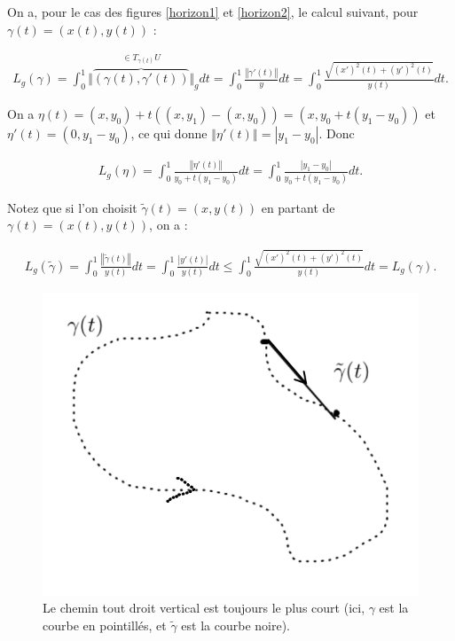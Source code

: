 \documentclass[french]{article}
\theoremstyle{definition}
\begin{document}
On a, pour le cas des figures \ref{horizon1} et \ref{horizon2}, le calcul suivant, pour \(\gamma(t) = (x(t), y(t))\) :

\begin{gather*}
  L_g(\gamma) = \int_{0}^{1}  \Vert \overbrace{(\gamma(t), \gamma'(t))}^{\in T _{{\gamma}(t)}U} \Vert_g  dt = \int_{0}^{1} \frac{\left\Vert \gamma'(t) \right\Vert }{y}dt = \int_{0}^{1} \frac{\sqrt{(x')^2(t)+ (y')^2(t)}}{y(t)} dt.
\end{gather*}

On a \(\eta(t) = (x,y_0) + t((x,y_1)-(x,y_0)) = (x,y_0 + t(y_1 - y_0))\) et \(\eta'(t) = (0,y_1-y_0)\), ce qui donne \(\left\Vert \eta'(t)\right\Vert   = \left\lvert y_1 - y_0 \right\rvert  \). Donc

\begin{gather*}
  L_g(\eta) = \int_{0}^{1} \frac{\left\Vert \eta'(t) \right\Vert }{y_0 + t(y_1-y_0)}dt = \int_{0}^{1} \frac{\left\lvert y_1-y_0 \right\rvert}{y_0 + t(y_1-y_0)}dt.
\end{gather*}

Notez que si l'on choisit \(\tilde{\gamma}(t)=(x,y(t))\) en partant de \(\gamma(t) = (x(t),y(t))\), on a :

\begin{gather*}
  L_g(\tilde{\gamma}) = \int_{0}^{1} \frac{\left\Vert \tilde{\gamma}(t) \right\Vert }{y(t)}dt = \int_{0}^{1} \frac{\left\lvert y'(t) \right\rvert}{y(t)}dt \leq  \int_{0}^{1} \frac{\sqrt{(x')^2(t) + (y')^2(t)}}{y(t)}dt = L_g(\gamma).
\end{gather*}

\begin{figure}[h!]
  \centering
  \includegraphics[scale=0.2, angle=-41]{figures/chemin-vert-court-corr.png}
  \caption{Le chemin tout droit vertical est toujours le plus court (ici, \(\gamma\) est la courbe en pointillés, et \(\widetilde{\gamma}\) est la courbe noire).}
  \label{chemin-vert-court}
\end{figure}
\end{document}
